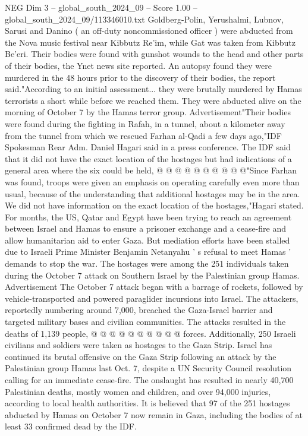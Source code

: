 \begin{textsample}{NEG Dim 3 – global\_south\_2024\_09 – Score 1.00 – global\_south\_2024\_09/113346010.txt}  \label{ex:f3_neg_133}
Goldberg-Polin, Yerushalmi, Lubnov, Sarusi and Danino ( an off-duty noncommissioned officer ) were abducted from the Nova music festival near Kibbutz Re'im, while Gat was taken from Kibbutz Be'eri.
Their bodies were found with gunshot wounds to the head and other parts of their bodies, the Ynet news site reported.
An autopsy found they were murdered in the 48 hours prior to the discovery of their bodies, the report said."According to an initial assessment... they were brutally murdered by Hamas terrorists a short while before we reached them.
They were abducted alive on the morning of October 7 by the Hamas terror group.
Advertisement"Their bodies were found during the fighting in Rafah, in a tunnel, about a kilometer away from the tunnel from which we rescued Farhan al-Qadi a few days ago,"IDF Spokesman Rear Adm.
Daniel Hagari said in a press conference.
The IDF said that it did not have the exact location of the hostages but had indications of a general area where the six could be held, @ @ @ @ @ @ @ @ @ @"Since Farhan was found, troops were given an emphasis on operating carefully even more than usual, because of the understanding that additional hostages may be in the area.
We did not have information on the exact location of the hostages,"Hagari stated.
For months, the US, Qatar and Egypt have been trying to reach an agreement between Israel and Hamas to ensure a prisoner exchange and a cease-fire and allow humanitarian aid to enter Gaza.
But mediation efforts have been stalled due to Israeli Prime Minister Benjamin Netanyahu ' s refusal to meet Hamas ' demands to stop the war.
The hostages were among the 251 individuals taken during the October 7 attack on Southern Israel by the Palestinian group Hamas.
Advertisement The October 7 attack began with a barrage of rockets, followed by vehicle-transported and powered paraglider incursions into Israel.
The attackers, reportedly numbering around 7,000, breached the Gaza-Israel barrier and targeted military bases and civilian communities.
The attacks resulted in the deaths of 1,139 people, @ @ @ @ @ @ @ @ @ @ forces.
Additionally, 250 Israeli civilians and soldiers were taken as hostages to the Gaza Strip.
Israel has continued its brutal offensive on the Gaza Strip following an attack by the Palestinian group Hamas last Oct. 7, despite a UN Security Council resolution calling for an immediate cease-fire.
The onslaught has resulted in nearly 40,700 Palestinian deaths, mostly women and children, and over 94,000 injuries, according to local health authorities.
It is believed that 97 of the 251 hostages abducted by Hamas on October 7 now remain in Gaza, including the bodies of at least 33 confirmed dead by the IDF.

\end{textsample}
